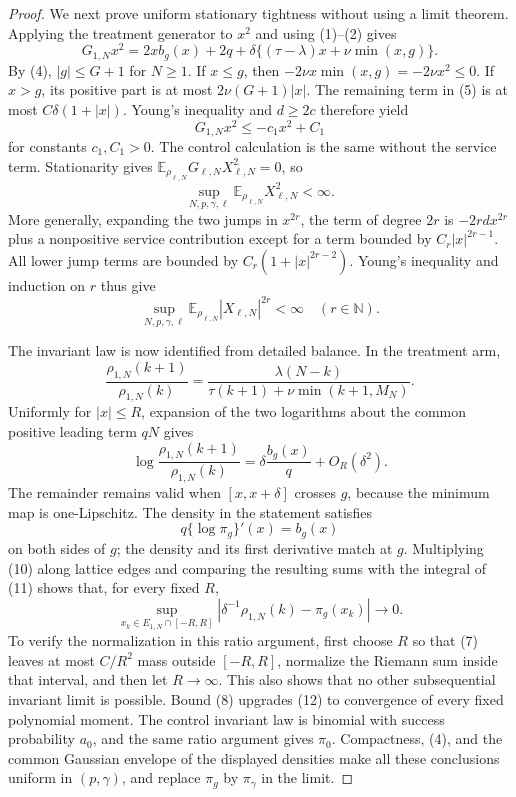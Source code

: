 \documentclass{article}
\begin{document}
\begin{proof}
We next prove uniform stationary tightness without using a limit theorem.  Applying the treatment generator to \(x^2\) and using (1)--(2) gives
\[
 G_{1,N}x^2=2xb_g(x)+2q+\delta\{(\tau-\lambda)x+\nu\min(x,g)\}. \tag{5}
\]
By (4), \(|g|\leq G+1\) for \(N\geq1\).  If \(x\leq g\), then \(-2\nu x\min(x,g)=-2\nu x^2\leq0\).  If \(x>g\), its positive part is at most \(2\nu(G+1)|x|\).  The remaining term in (5) is at most \(C\delta(1+|x|)\).  Young's inequality and \(d\geq2c\) therefore yield
\[
 G_{1,N}x^2\leq-c_1x^2+C_1                                  \tag{6}
\]
for constants \(c_1,C_1>0\).  The control calculation is the same without the service term.  Stationarity gives \(\mathbb E_{\rho_{\ell,N}}G_{\ell,N}X_{\ell,N}^2=0\), so
\[
 \sup_{N,p,\gamma,\ell}\mathbb E_{\rho_{\ell,N}}X_{\ell,N}^2<\infty. \tag{7}
\]
More generally, expanding the two jumps in \(x^{2r}\), the term of degree \(2r\) is \(-2rdx^{2r}\) plus a nonpositive service contribution except for a term bounded by \(C_r|x|^{2r-1}\).  All lower jump terms are bounded by \(C_r(1+|x|^{2r-2})\).  Young's inequality and induction on \(r\) thus give
\[
 \sup_{N,p,\gamma,\ell}\mathbb E_{\rho_{\ell,N}}|X_{\ell,N}|^{2r}<\infty
 \quad(r\in\mathbb N).                                      \tag{8}
\]

The invariant law is now identified from detailed balance.  In the treatment arm,
\[
 \frac{\rho_{1,N}(k+1)}{\rho_{1,N}(k)}
 =\frac{\lambda(N-k)}{\tau(k+1)+\nu\min(k+1,M_N)}.            \tag{9}
\]
Uniformly for \(|x|\leq R\), expansion of the two logarithms about the common positive leading term \(qN\) gives
\[
 \log\frac{\rho_{1,N}(k+1)}{\rho_{1,N}(k)}
 =\delta\frac{b_g(x)}q+O_R(\delta^2).                          \tag{10}
\]
The remainder remains valid when \([x,x+\delta]\) crosses \(g\), because the minimum map is one-Lipschitz.  The density in the statement satisfies
\[
 q\{\log\pi_g\}'(x)=b_g(x)                                  \tag{11}
\]
on both sides of \(g\); the density and its first derivative match at \(g\).  Multiplying (10) along lattice edges and comparing the resulting sums with the integral of (11) shows that, for every fixed \(R\),
\[
 \sup_{x_k\in E_{1,N}\cap[-R,R]}
 \left|\delta^{-1}\rho_{1,N}(k)-\pi_g(x_k)\right|\longrightarrow0. \tag{12}
\]
To verify the normalization in this ratio argument, first choose \(R\) so that (7) leaves at most \(C/R^2\) mass outside \([-R,R]\), normalize the Riemann sum inside that interval, and then let \(R\to\infty\).  This also shows that no other subsequential invariant limit is possible.  Bound (8) upgrades (12) to convergence of every fixed polynomial moment.  The control invariant law is binomial with success probability \(a_0\), and the same ratio argument gives \(\pi_0\).  Compactness, (4), and the common Gaussian envelope of the displayed densities make all these conclusions uniform in \((p,\gamma)\), and replace \(\pi_g\) by \(\pi_\gamma\) in the limit.


\end{proof}
\end{document}
